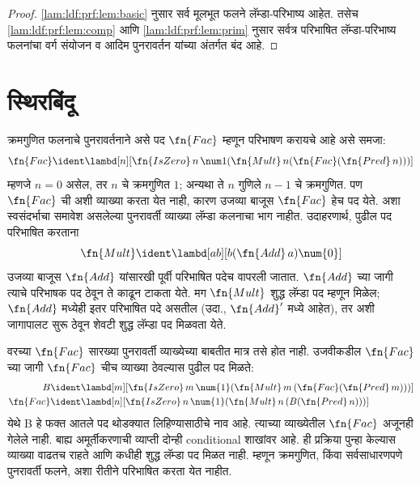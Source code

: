 \begin{proof}
  \ref{lam:ldf:prf:lem:basic} नुसार सर्व मूलभूत फलने
  लॅम्डा-परिभाष्य आहेत. तसेच \ref{lam:ldf:prf:lem:comp}
  आणि \ref{lam:ldf:prf:lem:prim} नुसार सर्वत्र परिभाषित लॅम्डा-परिभाष्य
  फलनांचा वर्ग संयोजन व आदिम पुनरावर्तन यांच्या
  अंतर्गत बंद आहे.
\end{proof}












\section{स्थिरबिंदू}\label{lam:ldf:fp:sec}

क्रमगुणित फलनाचे पुनरावर्तनाने असे पद $\fn{Fac}$
म्हणून परिभाषण करायचे आहे असे समजा:
\[\fn{Fac} \ident \lambd[n][\fn{IsZero}\, n\, \num 1 (\fn{Mult}\, n (\fn{Fac}(\fn{Pred} \, n)))]
\]
म्हणजे $n = 0$ असेल, तर $n$ चे क्रमगुणित $1$;
अन्यथा ते $n$ गुणिले $n-1$ चे क्रमगुणित.
पण $\fn{Fac}$ ची अशी व्याख्या करता येत नाही,
कारण उजव्या बाजूस $\fn{Fac}$ हेच पद येते.
अशा स्वसंदर्भाचा समावेश असलेल्या पुनरावर्ती
व्याख्या लॅम्डा कलनाचा भाग नाहीत. उदाहरणार्थ,
पुढील पद परिभाषित करताना
\[\fn{Mult} \ident \lambd[ab][b (\fn{Add}\, a) \num{0}]
\]
उजव्या बाजूस $\fn{Add}$ यांसारखी पूर्वी परिभाषित
पदेच वापरली जातात. $\fn{Add}$ च्या जागी त्याचे
परिभाषक पद ठेवून ते काढून टाकता येते. मग
$\fn{Mult}$ शुद्ध लॅम्डा पद म्हणून मिळेल;
$\fn{Add}$ मध्येही इतर परिभाषित पदे असतील
(उदा., $\fn{Add}'$ मध्ये आहेत), तर अशी जागापालट
सुरू ठेवून शेवटी शुद्ध लॅम्डा पद मिळवता येते.

वरच्या $\fn{Fac}$ सारख्या पुनरावर्ती व्याख्येच्या
बाबतीत मात्र तसे होत नाही. उजवीकडील $\fn{Fac}$
च्या जागी $\fn{Fac}$ चीच व्याख्या ठेवल्यास पुढील पद मिळते:
\begin{align*}
  B &\ident \lambd[m][\fn{IsZero}\,m\,\num{1}
       (\fn{Mult}\,m\,(\fn{Fac}(\fn{Pred}\,m)))]\\
  \fn{Fac} &\ident \lambd[n][\fn{IsZero}\,n\,\num{1}
       (\fn{Mult}\,n\,(B(\fn{Pred}\,n)))]
\end{align*}
येथे B हे फक्त आतले पद थोडक्यात लिहिण्यासाठीचे नाव आहे.
त्याच्या व्याख्येतील $\fn{Fac}$ अजूनही गेलेले नाही.
बाह्य अमूर्तीकरणाची व्याप्ती दोन्ही conditional शाखांवर आहे.
ही प्रक्रिया पुन्हा केल्यास व्याख्या वाढतच राहते
आणि कधीही शुद्ध लॅम्डा पद मिळत नाही. म्हणून
क्रमगुणित, किंवा सर्वसाधारणपणे पुनरावर्ती फलने,
अशा रीतीने परिभाषित करता येत नाहीत.

